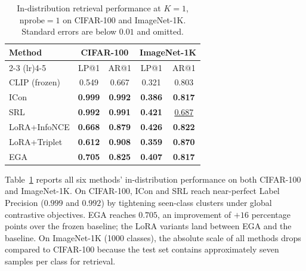 \documentclass{article}
\begin{document}
\begin{table}
	\vspace{-1.5em}

	\centering
	\caption{In-distribution retrieval performance at $K=1$, $\text{nprobe}=1$ on CIFAR-100 and ImageNet-1K.
		Standard errors are below $0.01$ and omitted.
	}
	\label{tab:indist_summary}
	\small
	\setlength{\tabcolsep}{3.5pt}
	\begin{tabular}{lcccc}
		\toprule
		\multirow{2}{*}{Method} & \multicolumn{2}{c}{CIFAR-100} & \multicolumn{2}{c}{ImageNet-1K}                                      \\
		\cmidrule(lr){2-3} \cmidrule(lr){4-5}
		                        & LP@1                          & AR@1                            & LP@1           & AR@1              \\
		\midrule
		CLIP (frozen)           & 0.549                         & 0.667                           & 0.321          & 0.803             \\
		ICon                    & \textbf{0.999}                & \textbf{0.992}                  & \textbf{0.386} & \textbf{0.817}    \\
		SRL                     & \textbf{0.992}                & \textbf{0.991}                  & \textbf{0.421} & \underline{0.687} \\
		LoRA+InfoNCE            & \textbf{0.668}                & \textbf{0.879}                  & \textbf{0.426} & \textbf{0.822}    \\
		LoRA+Triplet            & \textbf{0.612}                & \textbf{0.908}                  & \textbf{0.359} & \textbf{0.870}    \\
		EGA                     & \textbf{0.705}                & \textbf{0.825}                  & \textbf{0.407} & \textbf{0.817}    \\
		\bottomrule
	\end{tabular}
	\vspace{-1em}
\end{table}
Table~\ref{tab:indist_summary} reports all six methods' in-distribution performance on both CIFAR-100 and ImageNet-1K.
On CIFAR-100, ICon and SRL reach near-perfect Label Precision ($0.999$ and $0.992$) by tightening seen-class clusters under global contrastive objectives.
EGA reaches $0.705$, an improvement of $+16$ percentage points over the frozen baseline; the LoRA variants land between EGA and the baseline.
On ImageNet-1K (1000 classes), the absolute scale of all methods drops compared to CIFAR-100 because the test set contains approximately seven samples per class for retrieval.
\end{document}
